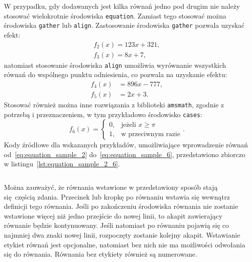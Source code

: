 W przypadku, gdy dodawanych jest kilka równań jedno pod drugim nie należy stosować wielokrotnie środowiska \texttt{equation}. Zamiast tego stosować można środowiska \texttt{gather} lub \texttt{align}. Zastosowanie środowiska \texttt{gather} pozwala uzyskać efekt:
\begin{gather}
f_{2}(x) = 123 x + 321 \label{eq:equation_sample_2}, \\
f_{3}(x) = 8 x + 7 \label{eq:equation_sample_3},
\end{gather}
natomiast stosowanie środowiska \texttt{align} umożliwia wyrównanie wszystkich równań do wspólnego punktu odniesienia, co pozwala na uzyskanie efektu:
\begin{align}
f_{4}(x) &= 896 x - 777 \label{eq:equation_sample_4}, \\
f_{5}(x) &= 2 x + 3 \label{eq:equation_sample_5}.
\end{align}
Stosować również można inne rozwiązania z biblioteki \texttt{amsmath}, zgodnie z potrzebą i przeznaczeniem, w tym przykładowo środowisko \texttt{cases}:
\begin{equation}
f_{6}(x) =
\begin{cases}
0, & \text{jeżeli $x \ge \pi$}  \\
1, & \text{w przeciwnym razie}
\end{cases}
\label{eq:equation_sample_6}.
\end{equation}
Kody źródłowe dla wskazanych przykładów, umożliwiające wprowadzenie równań od~\eqref{eq:equation_sample_2} do~\eqref{eq:equation_sample_6}, przedstawiono zbiorczo w listingu~\ref{lst:equation_sample_2_6}.

\begin{listing}[htb]
\inputminted{latex}{skrypty/equations_sample.tex}
\end{listing}

Można zauważyć, że równania wstawione w przedstawiony sposób stają się częścią zdania. Przecinek lub kropkę po równaniu wstawia się wewnątrz definicji tego równania. Jeśli po zakończeniu środowiska równania nie zostanie wstawione więcej niż jedno przejście do nowej linii, to akapit zawierający równanie będzie kontynuowany. Jeśli natomiast po równaniu pojawią się co najmniej dwa znaki nowej linii, rozpoczęty zostanie kolejny akapit. Wstawianie etykiet równań jest opcjonalne, natomiast bez nich nie ma możliwości odwołania się do równania. Równania bez etykiety również są numerowane.

